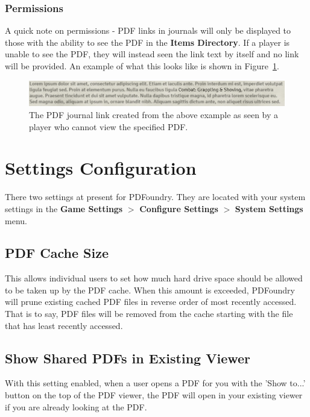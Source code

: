 \documentclass{article}
\begin{document}
    \subsubsection{Permissions}
    A quick note on permissions - PDF links in journals will only be displayed to those with the ability to see the PDF in the \textbf{Items Directory}. If a player is unable to see the PDF, they will instead seen the link text by itself and no link will be provided. An example of what this looks like is shown in Figure~\ref{rich-text-link-example-permissions}.

    \begin{figure}[h]
        \centering
        \includegraphics[width=1\textwidth]{images/rich-text-link-example-permissions.png}
        \caption{The PDF journal link created from the above example as seen by a player who cannot view the specified PDF.}
        \label{rich-text-link-example-permissions}
    \end{figure}

    \section{Settings Configuration}
    There two settings at present for PDFoundry. They are located with your system settings in the \textbf{Game Settings} $>$ \textbf{Configure Settings} $>$ \textbf{System Settings} menu.

    \begin{description}

        \item \subsection{PDF Cache Size} This allows individual users to set how much hard drive space should be allowed to be taken up by the PDF cache. When this amount is exceeded, PDFoundry will prune existing cached PDF files in reverse order of most recently accessed. That is to say, PDF files will be removed from the cache starting with the file that has least recently accessed.

        \item \subsection{Show Shared PDFs in Existing Viewer} With this setting enabled, when a user opens a PDF for you with the 'Show to...' button on the top of the PDF viewer, the PDF will open in your existing viewer if you are already looking at the PDF.

    \end{description}
\end{document}
